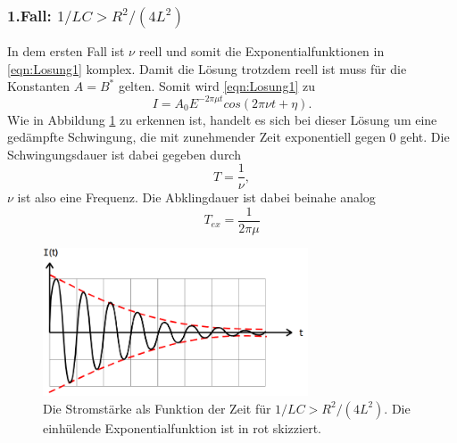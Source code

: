 \subsubsection*{1.Fall: $1/LC>R^2/(4L^2)$}
In dem ersten Fall ist $\nu$ reell und somit die Exponentialfunktionen in \eqref{eqn:Losung1} komplex. Damit die Lösung trotzdem reell ist muss
für die Konstanten $A=B^{*}$ gelten. Somit wird \eqref{eqn:Losung1} zu
\begin{equation*}
    I=A_0E^{-2\pi\mu t} cos(2\pi\nu t+\eta).
    \label{eqn:Fall1}
\end{equation*}
Wie in Abbildung \ref{fig:Fall1} zu erkennen ist, handelt es sich bei dieser Lösung um eine gedämpfte Schwingung, die mit zunehmender Zeit 
exponentiell gegen 0 geht. Die Schwingungsdauer ist dabei gegeben durch
\begin{equation*}
    T=\frac{1}{\nu} ,
\end{equation*}
$\nu$ ist also eine Frequenz. Die Abklingdauer ist dabei beinahe analog
\begin{equation}
    T_{ex}=\frac{1}{2\pi\mu}
    \label{eqn:Tex}
\end{equation}
\begin{figure}[H]
    \centering
    \includegraphics[width=0.7\textwidth]{pictures/Fall1.png}
    \caption{Die Stromstärke als Funktion der Zeit für $1/LC>R^2/(4L^2)$. Die einhülende Exponentialfunktion ist in rot skizziert.\cite{AP01}}
    \label{fig:Fall1}
\end{figure}

